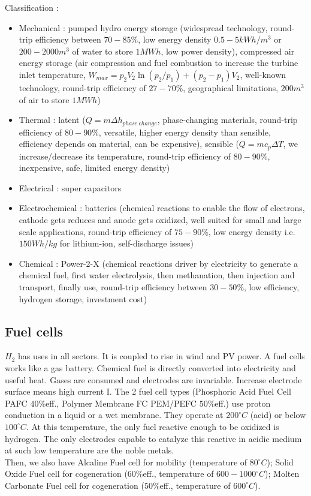 \documentclass[../main.tex]{subfiles}
\begin{document}
Classification :
\begin{itemize}
    \item Mechanical : pumped hydro energy storage (widespread technology, round-trip efficiency between $70-85\%$, low energy density $0.5-5 kWh/m^3$ or $200-2000m^3$ of water to store $1MWh$, low power density), compressed air energy storage (air compression and fuel combustion to increase the turbine inlet temperature, $W_{max} = p_2 V_2 \ln(p_2/p_1) + (p_2-p_1)V_2$, well-known technology, round-trip efficiency of $27-70\%$, geographical limitations, $200m^3$ of air to store $1MWh$)
    \item Thermal : latent ($Q = m \Delta h_{phase\: change}$, phase-changing materials, round-trip efficiency of $80-90\%$, versatile, higher energy density than sensible, efficiency depends on material, can be expensive), sensible ($Q = mc_p \Delta T$, we increase/decrease its temperature, round-trip efficiency of $80-90\%$, inexpensive, safe, limited energy density)
    \item Electrical : super capacitors
    \item Electrochemical : batteries (chemical reactions to enable the flow of electrons, cathode gets reduces and anode gets oxidized, well suited for small and large scale applications, round-trip efficiency of $75-90\%$, low energy density i.e. $150Wh/kg$ for lithium-ion, self-discharge issues)
    \item Chemical : Power-2-X (chemical reactions driver by electricity to generate a chemical fuel, first water electrolysis, then methanation, then injection and transport, finally use, round-trip efficiency between $30-50\%$, low efficiency, hydrogen storage, investment cost)
\end{itemize}

\subsection{Fuel cells}
$H_2$ has uses in all sectors. It is coupled to rise in wind and PV power. A fuel cells works like a gas battery. Chemical fuel is directly converted into electricity and useful heat. Gases are consumed and electrodes are invariable. Increase electrode surface means high current I. The 2 fuel cell types (Phosphoric Acid Fuel Cell PAFC $40\%$eff., Polymer Membrane FC PEM/PEFC $50\%$eff.) use proton conduction in a liquid or a wet membrane. They operate at $200^\circ C$ (acid) or below $100^\circ C$. At this temperature, the only fuel reactive enough to be oxidized is hydrogen. The only electrodes capable to catalyze this reactive in acidic medium at such low temperature are the noble metals. \\
Then, we also have Alcaline Fuel cell for mobility (temperature of $80^\circ C$); Solid Oxide Fuel cell for cogeneration ($60\%$eff., temperature of $600-1000^\circ C$); Molten Carbonate Fuel cell for cogeneration ($50\%$eff., temperature of $600^\circ C$).\\
\end{document}
